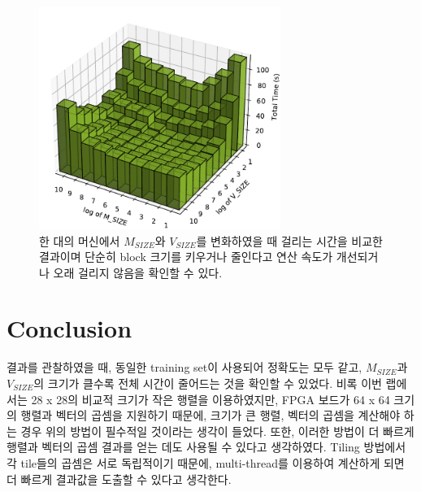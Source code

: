 \documentclass{article}
\begin{document}
\begin{figure}[ht]
	\centering
	\includegraphics[width=0.7\textwidth]{fig7.pdf}
	\caption{한 대의 머신에서 $M_{SIZE}$와 $V_{SIZE}$를 변화하였을 때 걸리는 시간을 비교한 결과이며 단순히 block 크기를 키우거나 줄인다고 연산 속도가 개선되거나 오래 걸리지 않음을 확인할 수 있다.}
\label{fig7}
\end{figure}

\newpage
\section{Conclusion}
결과를 관찰하였을 때, 동일한 training set이 사용되어 정확도는 모두 같고, $M_{SIZE}$과 $V_{SIZE}$의 크기가 클수록 전체 시간이 줄어드는 것을 확인할 수 있었다.
비록 이번 랩에서는 28 x 28의 비교적 크기가 작은 행렬을 이용하였지만, FPGA 보드가 64 x 64 크기의 행렬과 벡터의 곱셈을 지원하기 때문에, 크기가 큰 행렬, 벡터의 곱셈을 계산해야 하는 경우 위의 방법이 필수적일 것이라는 생각이 들었다.
또한, 이러한 방법이 더 빠르게 행렬과 벡터의 곱셈 결과를 얻는 데도 사용될 수 있다고 생각하였다.
Tiling 방법에서 각 tile들의 곱셈은 서로 독립적이기 때문에, multi-thread를 이용하여 계산하게 되면 더 빠르게 결과값을 도출할 수 있다고 생각한다.
\end{document}

